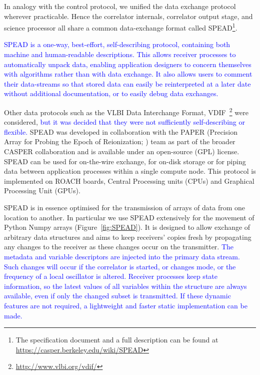 \noindent
In analogy with the control protocol, we unified the data exchange
protocol wherever practicable. Hence the correlator internals,
correlator output stage, and science processor all share a common
data-exchange format called
SPEAD\footnote{The specification document and a full description can
be found at \url{https://casper.berkeley.edu/wiki/SPEAD}}. 


\textcolor{blue}{
SPEAD is a one-way, best-effort, self-describing protocol, containing
both machine and human-readable descriptions. This allows receiver
processes to automatically unpack data, enabling application designers
to concern themselves with algorithms rather than with data
exchange. It also allows users to comment their data-streams so that
stored data can easily be reinterpreted at a later date without
additional documentation, or to easily debug data exchanges.}

Other data protocols such as the VLBI Data Interchange Format, 
VDIF~\footnote{\url{http://www.vlbi.org/vdif/}} were considered, 
\textcolor{blue}{but it was decided
that they were not sufficiently self-describing or flexible.
}
SPEAD was
developed in collaboration with the PAPER (Precision Array for Probing
the Epoch of Reionization; \citealt{parsons}) team as part of the
broader CASPER collaboration and is available under an open-source
(GPL) license. SPEAD can be used for on-the-wire exchange, for on-disk
storage or for piping data between application processes within a
single compute node. 
This protocol is implemented on ROACH boards, Central Processing
units (CPUs) and Graphical Processing Unit (GPUs).

SPEAD is in essence optimised for the transmission of arrays of data
from one location to another. In particular we use SPEAD extensively
for the movement of Python Numpy arrays (Figure~\ref{fig:SPEAD}).  It
is designed to allow exchange of arbitrary data structures and aims to keep
receivers' copies fresh by propagating any changes
to the receiver as these changes occur on the transmitter.
\textcolor{blue}{
The metadata and variable descriptors are injected into the primary data stream.
Such changes will occur if the correlator is started, or changes mode,
or the frequency of a local oscillator is altered.
Receiver processes keep state information, so
the latest values of all variables within the structure are always
available, even if only the changed subset is transmitted.
If these dynamic features are not required, a lightweight and faster
static implementation can be made.}

